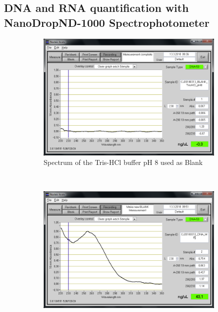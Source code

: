 \subsection{DNA and RNA quantification with NanoDrop\cR ND-1000 Spectrophotometer}
\label{task:20180313_cj0}

\begin{figure}[H] %
    \centering
    \caption{NanoDrop spectra for DNA and RNA isolated with MasterPure\texttrademark~ Kit}
    \label{fig:label}
    \begin{subfigure}[b]{0.3\textwidth}
        \includegraphics[width=\textwidth]{graphics/screenshots/CJ20180313_BLANK_TrisHCl_pH8.png}
        \caption{Spectrum of the Tris-HCl buffer pH 8 used as Blank}
        \label{sfig:CJ20180313_BLANK_TrisHCl_pH8}
    \end{subfigure}
    ~ 
    \begin{subfigure}[b]{0.3\textwidth}
        \includegraphics[width=\textwidth]{graphics/screenshots/CJ20180313_DNA_MP.png}

\end{subfigure}
\end{figure}
